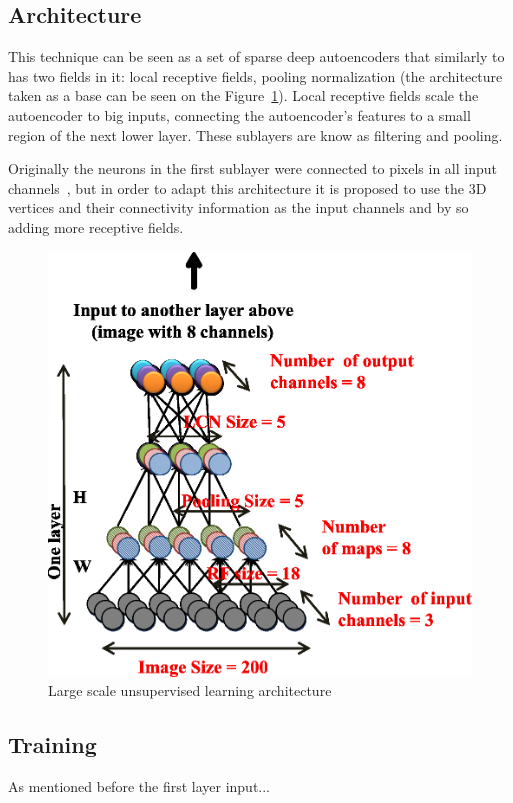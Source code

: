 \documentclass{comjnl}
\begin{document}
\subsection{Architecture}
This technique can be seen as a set of sparse deep autoencoders that
similarly to~\cite{UnsLearning} has two fields in it: local receptive fields,
pooling normalization (the architecture taken as a base can be seen
on the Figure~\ref{fig:architecture}). Local receptive fields scale the
autoencoder to big inputs, connecting the autoencoder's features to a small
region of the next lower layer. These sublayers are know as filtering and
pooling.

Originally the neurons in the first sublayer were connected to
pixels in all input channels~\cite{UnsLearning}, but in order to adapt
this architecture it is proposed to use the 3D vertices and their
connectivity information as the input channels and by so adding more
receptive fields.

\begin{figure}
\includegraphics[width=0.9\linewidth]{architecture.png}
\caption{Large scale unsupervised learning architecture \cite{UnsLearning}}
\label{fig:architecture}
\end{figure}

\subsection{Training}
As mentioned before the first layer input...
\end{document}
